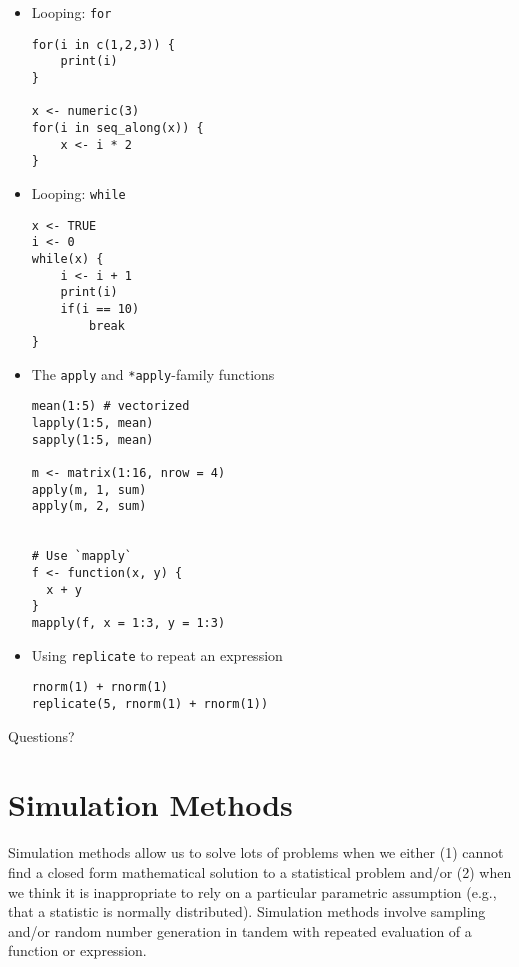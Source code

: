 \documentclass[a4paper,12pt]{article}
\begin{document}
\begin{itemize}

\item Looping: \texttt{for}

\begin{lstlisting}
for(i in c(1,2,3)) {
    print(i)
}

x <- numeric(3)
for(i in seq_along(x)) {
    x <- i * 2
}
\end{lstlisting}



\item Looping: \texttt{while}

\begin{lstlisting}
x <- TRUE
i <- 0
while(x) {
    i <- i + 1
    print(i)
    if(i == 10)
        break
}
\end{lstlisting}


\item The \texttt{apply} and \texttt{*apply}-family functions


\begin{lstlisting}
mean(1:5) # vectorized
lapply(1:5, mean)
sapply(1:5, mean)

m <- matrix(1:16, nrow = 4)
apply(m, 1, sum)
apply(m, 2, sum)


# Use `mapply`
f <- function(x, y) {
  x + y
}
mapply(f, x = 1:3, y = 1:3)
\end{lstlisting}


\item Using \texttt{replicate} to repeat an expression

\begin{lstlisting}
rnorm(1) + rnorm(1)
replicate(5, rnorm(1) + rnorm(1))
\end{lstlisting}


\end{itemize}


Questions?

\section{Simulation Methods}

Simulation methods allow us to solve lots of problems when we either (1) cannot find a closed form mathematical solution to a statistical problem and/or (2) when we think it is inappropriate to rely on a particular parametric assumption (e.g., that a statistic is normally distributed). Simulation methods involve sampling and/or random number generation in tandem with repeated evaluation of a function or expression.
\end{document}
